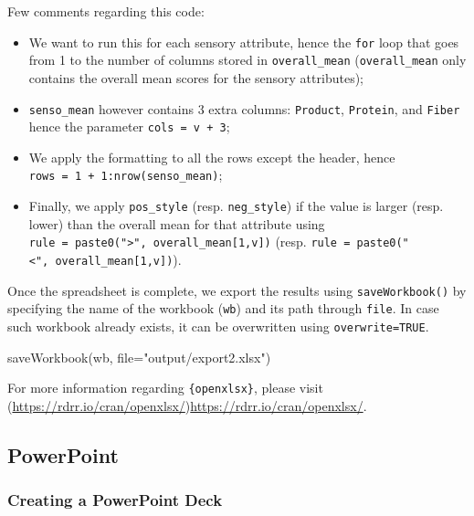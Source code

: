 \documentclass[
]{krantz}
\makeatletter
\newenvironment{Shaded}{\begin{snugshade}}{\end{snugshade}}
\newcommand{\AttributeTok}[1]{\textcolor[rgb]{0.61,0.61,0.61}{#1}}
\newcommand{\FunctionTok}[1]{\textcolor[rgb]{0,0,0}{#1}}
\newcommand{\NormalTok}[1]{#1}
\newcommand{\StringTok}[1]{\textcolor[rgb]{0.5,0.5,0.5}{#1}}
\providecommand{\tightlist}{%
  \setlength{\itemsep}{0pt}\setlength{\parskip}{0pt}}
\newenvironment{kframe}{%
\medskip{}
\setlength{\fboxsep}{.8em}
 \def\at@end@of@kframe{}%
 \ifinner\ifhmode%
  \def\at@end@of@kframe{\end{minipage}}%
  \begin{minipage}{\columnwidth}%
 \fi\fi%
 \def\FrameCommand##1{\hskip\@totalleftmargin \hskip-\fboxsep
 \colorbox{shadecolor}{##1}\hskip-\fboxsep
     \hskip-\linewidth \hskip-\@totalleftmargin \hskip\columnwidth}%
 \MakeFramed {\advance\hsize-\width
   \@totalleftmargin\z@ \linewidth\hsize
   \@setminipage}}%
 {\par\unskip\endMakeFramed%
 \at@end@of@kframe}
\renewenvironment{Shaded}{\begin{kframe}}{\end{kframe}}
\makeatother
\begin{document}
Few comments regarding this code:

\begin{itemize}
\tightlist
\item
  We want to run this for each sensory attribute, hence the \texttt{for} loop that goes from 1 to the number of columns stored in \texttt{overall\_mean} (\texttt{overall\_mean} only contains the overall mean scores for the sensory attributes);
\item
  \texttt{senso\_mean} however contains 3 extra columns: \texttt{Product}, \texttt{Protein}, and \texttt{Fiber} hence the parameter \texttt{cols\ =\ v\ +\ 3};
\item
  We apply the formatting to all the rows except the header, hence \texttt{rows\ =\ 1\ +\ 1:nrow(senso\_mean)};
\item
  Finally, we apply \texttt{pos\_style} (resp. \texttt{neg\_style}) if the value is larger (resp. lower) than the overall mean for that attribute using \texttt{rule\ =\ paste0("\textgreater{}",\ overall\_mean{[}1,v{]})} (resp. \texttt{rule\ =\ paste0("\textless{}",\ overall\_mean{[}1,v{]})}).
\end{itemize}

Once the spreadsheet is complete, we export the results using \texttt{saveWorkbook()} by specifying the name of the workbook (\texttt{wb}) and its path through \texttt{file}. In case such workbook already exists, it can be overwritten using \texttt{overwrite=TRUE}.

\begin{Shaded}
\begin{Highlighting}[]
\FunctionTok{saveWorkbook}\NormalTok{(wb, }\AttributeTok{file=}\StringTok{"output/export2.xlsx"}\NormalTok{)}
\end{Highlighting}
\end{Shaded}

For more information regarding \texttt{\{openxlsx\}}, please visit (\url{https://rdrr.io/cran/openxlsx/})\url{https://rdrr.io/cran/openxlsx/}.

\hypertarget{powerpoint}{%
\subsection{PowerPoint}\label{powerpoint}}

\hypertarget{creating-a-powerpoint-deck}{%
\subsubsection{Creating a PowerPoint Deck}\label{creating-a-powerpoint-deck}}
\end{document}
